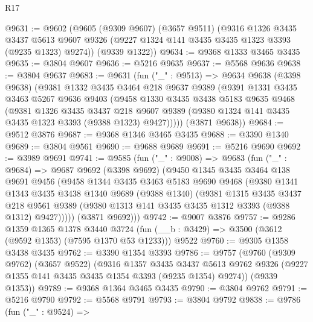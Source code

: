 \begin{lexlean}{R17}
\begin{coremodule}
@9631 := @9602
    (@9605
      (@9309 @9607)
      (@3657 @9511)
      (@9316
        @1326
        @3435
        @3437
        @5613
        @9607
        @9326
        (@9227 @1324 @141 @3435 @3435 @1323 @3393 (@9235 @1323) @9274))
      (@9339 @1322))
@9634 := @9368 @1333 @3465 @3435
@9635 := @3804 @9607
@9636 := @5216 @9635
@9637 := @5568 @9636
@9638 := @3804 @9637
@9683 := @9631
    (fun ("_" : @9513) =>
    @9634
      @9638
      (@3398 @9638)
      (@9381
        @1332
        @3435
        @3464
        @218
        @9637
        @9389
        (@9391
          @1331
          @3435
          @3463
          @5267
          @9636
          @9403
          (@9458
            @1330
            @3435
            @3438
            @5183
            @9635
            @9468
            (@9381
              @1326
              @3435
              @3437
              @218
              @9607
              @9389
              (@9380 @1324 @141 @3435 @3435 @1323 @3393 (@9388 @1323) @9427)))))
      (@3871 @9638))
@9684 := @9512 @3876
@9687 := @9368 @1346 @3465 @3435
@9688 := @3390 @1340
@9689 := @3804 @9561
@9690 := @9688 @9689
@9691 := @5216 @9690
@9692 := @3989 @9691
@9741 := @9585
    (fun ("_" : @9008) =>
    @9683
      (fun ("_" : @9684) =>
      @9687
        @9692
        (@3398 @9692)
        (@9450
          @1345
          @3435
          @3464
          @138
          @9691
          @9456
          (@9458
            @1344
            @3435
            @3463
            @5183
            @9690
            @9468
            (@9380
              @1341
              @1343
              @3435
              @3438
              @1340
              @9689
              (@9388 @1340)
              (@9381
                @1315
                @3435
                @3437
                @218
                @9561
                @9389
                (@9380 @1313 @141 @3435 @3435 @1312 @3393 (@9388 @1312) @9427)))))
        (@3871 @9692)))
@9742 := @9007 @3876
@9757 := @9286
    @1359
    @1365
    @1378
    @3440
    @3724
    (fun (__b : @3429) => @3500 (@3612 (@9592 @1353) (@7595 @1370 @53 @1233)))
    @9522
@9760 := @9305 @1358 @3438 @3435
@9762 := @3390 @1354 @3393
@9786 := @9757
    (@9760
      (@9309 @9762)
      (@3657 @9522)
      (@9316
        @1357
        @3435
        @3437
        @5613
        @9762
        @9326
        (@9227 @1355 @141 @3435 @3435 @1354 @3393 (@9235 @1354) @9274))
      (@9339 @1353))
@9789 := @9368 @1364 @3465 @3435
@9790 := @3804 @9762
@9791 := @5216 @9790
@9792 := @5568 @9791
@9793 := @3804 @9792
@9838 := @9786
    (fun ("_" : @9524) =>

\end{coremodule}
\end{lexlean}
